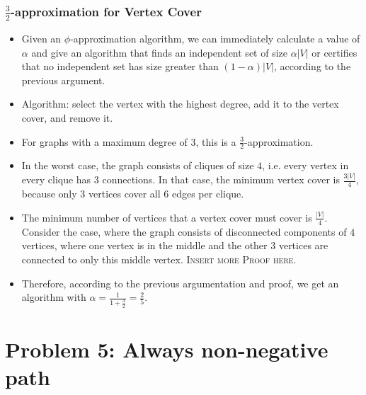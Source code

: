 \documentclass[12pt]{article}
\begin{document}
\subsubsection*{$\frac{3}{2}$-approximation for Vertex Cover}
\begin{itemize}
	\item Given an $\phi$-approximation algorithm, we can immediately calculate a value of $\alpha$ and give an algorithm that finds an independent set of size $\alpha |V|$ or certifies that no independent set has size greater than $(1-\alpha) |V|$, according to the previous argument.
	\item Algorithm: select the vertex with the highest degree, add it to the vertex cover, and remove it.
	\item For graphs with a maximum degree of 3, this is a $\frac{3}{2}$-approximation.
	\item In the worst case, the graph consists of cliques of size $4$, i.e. every vertex in every clique has $3$ connections. In that case, the minimum vertex cover is $\frac{3 |V|}{4}$, because only $3$ vertices cover all $6$ edges per clique.
	\item The minimum number of vertices that a vertex cover must cover is $\frac{|V|}{4}$. Consider the case, where the graph consists of disconnected components of $4$ vertices, where one vertex is in the middle and the other $3$ vertices are connected to only this middle vertex. \textsc{Insert more Proof here}.
	\item Therefore, according to the previous argumentation and proof, we get an algorithm with $\alpha=\frac{1}{1+\frac{3}{2}} = \frac{2}{5}$.
\end{itemize}

\newpage
\section*{Problem 5: Always non-negative path}
\end{document}

